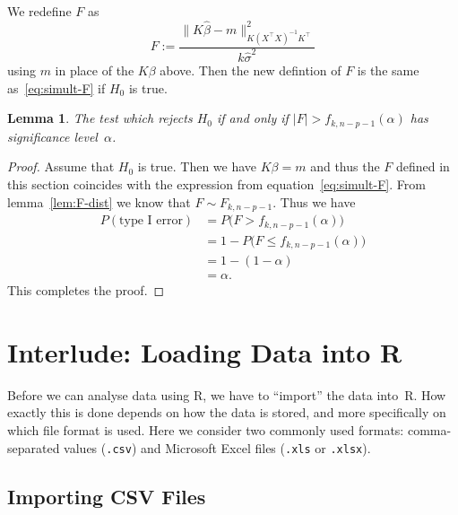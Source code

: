 \documentclass[
  a4paper,
]{article}
\newtheorem{lemma}{Lemma}[section]
\theoremstyle{definition}
\theoremstyle{definition}
\theoremstyle{definition}
\theoremstyle{definition}
\theoremstyle{remark}
\begin{document}
We redefine \(F\) as
\begin{equation*}
  F
  := \frac{\bigl\| K \hat\beta - m \bigr\|_{K(X^\top X)^{-1} K^\top}^2}
          {k \hat\sigma^2}
\end{equation*}
using \(m\) in place of the \(K\beta\) above. Then the new defintion of \(F\)
is the same as~\eqref{eq:simult-F} if \(H_0\) is true.

\begin{lemma}
\protect\hypertarget{lem:simult-test}{}\label{lem:simult-test}The test which rejects \(H_0\) if and only if \(|F| > f_{k,n-p-1}(\alpha)\)
has significance level~\(\alpha\).
\end{lemma}

\begin{proof}
Assume that \(H_0\) is true. Then we have \(K\beta = m\) and thus
the \(F\) defined in this section coincides with the expression from
equation~\eqref{eq:simult-F}. From lemma~\ref{lem:F-dist}
we know that \(F \sim F_{k, n-p-1}\). Thus we have
\begin{align*}
  P( \mbox{type I error} )
  &= P\bigl( F > f_{k,n-p-1}(\alpha) \bigr) \\
  &= 1 - P\bigl( F \leq f_{k,n-p-1}(\alpha) \bigr) \\
  &= 1 - (1 - \alpha) \\
  &= \alpha.
\end{align*}
This completes the proof.
\end{proof}

\clearpage

\hypertarget{I02-read.csv}{%
\section*{Interlude: Loading Data into R}\label{I02-read.csv}}

Before we can analyse data using R, we have to ``import'' the data
into~R. How exactly this is done depends on how the data is stored,
and more specifically on which file format is used. Here we consider
two commonly used formats: comma-separated values (\texttt{.csv})
and Microsoft Excel files (\texttt{.xls} or \texttt{.xlsx}).

\hypertarget{importing-csv-files}{%
\subsection*{Importing CSV Files}\label{importing-csv-files}}
\end{document}
